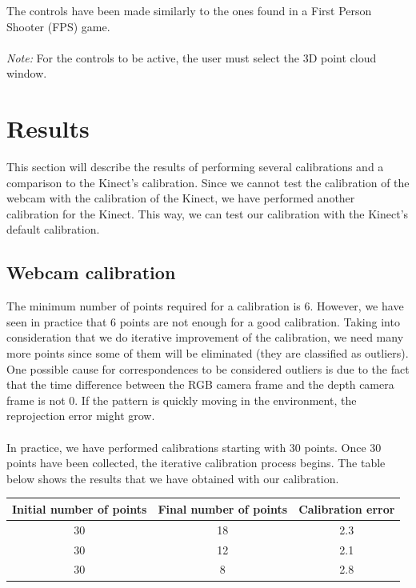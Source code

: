 \noindent
The controls have been made similarly to the ones found in a First Person Shooter (FPS) game. 
\\\\
\emph{Note:} For the controls to be active, the user must select the 3D point cloud window.

\section{Results}
\noindent
This section will describe the results of performing several calibrations and a comparison to the Kinect's calibration. Since we cannot test the calibration of the webcam with the calibration of the Kinect, we have performed another calibration for the Kinect. This way, we can test our calibration with the Kinect's default calibration. 

\subsection{Webcam calibration}
The minimum number of points required for a calibration is 6. However, we have seen in practice that 6 points are not enough for a good calibration. Taking into consideration that we do iterative improvement of the calibration, we need many more points since some of them will be eliminated (they are classified as outliers). One possible cause for correspondences to be considered outliers is due to the fact that the time difference between the RGB camera frame and the depth camera frame is not 0. If the pattern is quickly moving in the environment, the reprojection error might grow.  
\\\\
In practice, we have performed calibrations starting with 30 points. Once 30 points have been collected, the iterative calibration process begins. The table below shows the results that we have obtained with our calibration. 

\begin{center}
  \begin{tabular}{| c | c | c |}
    \hline
    Initial number of points & Final number of points & Calibration error \\ \hline
    30 & 18 & 2.3 \\ \hline
    30 & 12 & 2.1 \\ \hline
    30 & 8 & 2.8 \\
    \hline
  \end{tabular}
\end{center}

